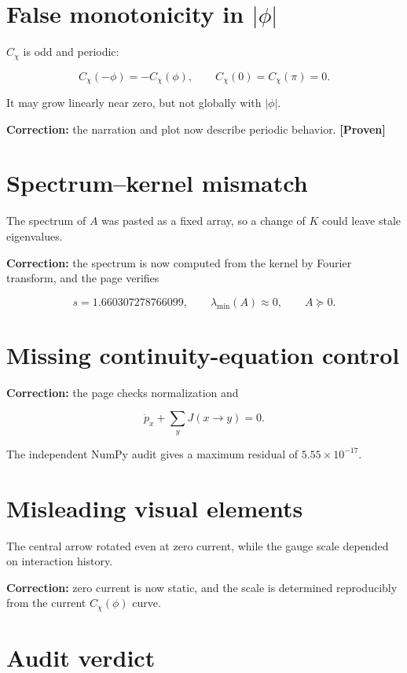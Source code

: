 \documentclass[11pt,a4paper,openany]{report}
\newcommand{\statusProven}{\textcolor{fingreen}{[Proven]}}
\begin{document}
\section{\texorpdfstring{False monotonicity in \(|\phi|\)}{False monotonicity in ||}}

\(C_\chi\) is odd and periodic:

\[
C_\chi(-\phi)=-C_\chi(\phi),\qquad
C_\chi(0)=C_\chi(\pi)=0.
\]

It may grow linearly near zero, but not globally with \(|\phi|\).

\textbf{Correction:} the narration and plot now describe periodic behavior. \textbf{\statusProven{}}

\section{Spectrum--kernel mismatch}

The spectrum of \(A\) was pasted as a fixed array, so a change of \(K\) could leave stale eigenvalues.

\textbf{Correction:} the spectrum is now computed from the kernel by Fourier transform, and the page verifies

\[
s=1.660307278766099,\qquad
\lambda_{\min}(A)\approx0,\qquad A\succeq0.
\]

\section{Missing continuity-equation control}

\textbf{Correction:} the page checks normalization and

\[
\dot p_x+\sum_yJ(x\to y)=0.
\]

The independent NumPy audit gives a maximum residual of \(5.55\times10^{-17}\).

\section{Misleading visual elements}

The central arrow rotated even at zero current, while the gauge scale depended on interaction history.

\textbf{Correction:} zero current is now static, and the scale is determined reproducibly from the current \(C_\chi(\phi)\) curve.

\section{Audit verdict}
\end{document}
